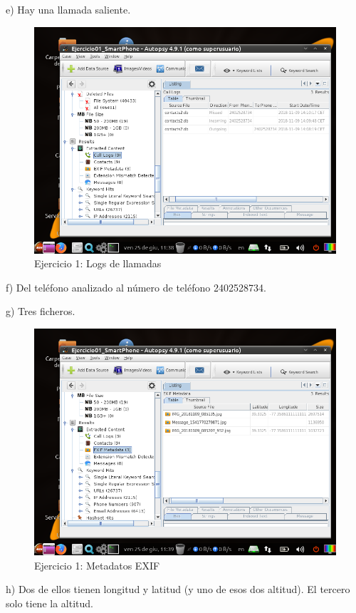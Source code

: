 \documentclass[11pt]{article}
\begin{document}
e) Hay una llamada saliente.

\begin{figure}[H]
    \caption{Ejercicio 1: Logs de llamadas}
    \centering
    \includegraphics[scale=0.7]{e1-9.png}
\end{figure}

f) Del teléfono analizado al número de teléfono 2402528734.

g) Tres ficheros.

\begin{figure}[H]
    \caption{Ejercicio 1: Metadatos EXIF}
    \centering
    \includegraphics[scale=0.7]{e1-10.png}
\end{figure}

h) Dos de ellos tienen longitud y latitud (y uno de esos dos altitud). El tercero solo tiene la altitud. 
\end{document}
